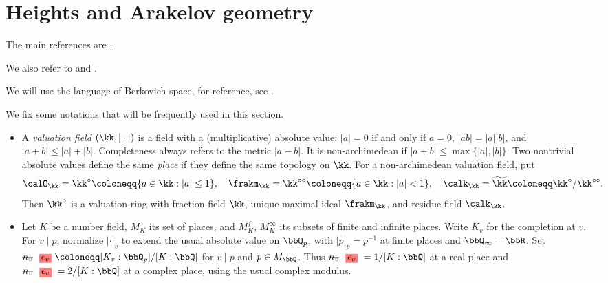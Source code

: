 \section{Heights and Arakelov geometry}

The main references are \cite{Yuan-Guo-2025-FirstCourseArakelov}.

We also refer to \cite[Appendices~A.5--A.6 and \S 5.4]{Yuan-Zhang-2026-AdelicLineBundles} and \cite[Chapter~3]{Chambert-Loir-2012-ArakelovGeometryHeights}.

We will use the language of Berkovich space, for reference, see \cite{Berkovich-2012-SpectralTheoryAnalytic,Ducros-Favre-Nicaise-2015-BerkovichSpacesApplications}.

\begin{notation}[label=\labelNFM{not:berkovich-space-and-a-geometry}, status=draft, tag=0000000]
	We fix some notations that will be frequently used in this section.
	\begin{itemize}
		\item A \emph{valuation field} $(\kk,|\cdot|)$ is a field with a (multiplicative) absolute value:
		      $|a| = 0$ if and only if $a = 0$, $|ab| = |a||b|$, and $|a+b| \leq |a|+|b|$.
		      Completeness always refers to the metric $|a-b|$.
		      It is non-archimedean if $|a + b| \leq \max\{|a|,|b|\}$.
		      Two nontrivial absolute values define the same \emph{place} if they define the same topology on $\kk$.
		      For a non-archimedean valuation field, put
		      \[ \calO_\kk = \kk^\circ \coloneqq \{a \in \kk : |a| \leq 1\}, \quad \frakm_\kk = \kk^{\circ\circ} \coloneqq \{a \in \kk : |a| < 1\}, \quad \calk_\kk = \widetilde{\kk} \coloneqq \kk^\circ/\kk^{\circ\circ}. \]
		      Then $\kk^\circ$ is a valuation ring with fraction field $\kk$, unique maximal ideal $\frakm_\kk$, and residue field $\calk_\kk$.
		\item Let $K$ be a number field, $M_K$ its set of places, and $M_K^f$, $M_K^\infty$ its subsets of finite and infinite places.
		      Write $K_v$ for the completion at $v$.
		      For $v \mid p$, normalize $|\cdot|_v$ to extend the usual absolute value on $\bbQ_p$, with $|p|_p = p^{-1}$ at finite places and $\bbQ_\infty = \bbR$.
		      Set $\latexdeletedmath{n_v}\latexaddedmath{\epsilon_v} \coloneqq [K_v:\bbQ_p]/[K:\bbQ]$ for $v \mid p$ and $p \in M_\bbQ$.
		      Thus $\latexdeletedmath{n_v}\latexaddedmath{\epsilon_v} = 1/[K:\bbQ]$ at a real place and $\latexdeletedmath{n_v}\latexaddedmath{\epsilon_v} = 2/[K:\bbQ]$ at a complex place, using the usual complex modulus.

\end{itemize}
\end{notation}

